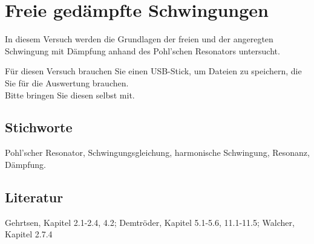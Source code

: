 \chapter{Freie gedämpfte Schwingungen}
\label{vn:1}

In diesem Versuch werden die Grundlagen der freien und der angeregten Schwingung mit Dämpfung anhand des Pohl'schen Resonators untersucht.
\begin{hint}
	Für diesen Versuch brauchen Sie einen USB-Stick, um Dateien zu speichern, die Sie für die Auswertung brauchen.\\
	Bitte bringen Sie diesen selbst mit.
\end{hint}


\section{Stichworte}
Pohl'scher Resonator, Schwingungsgleichung, harmonische Schwingung, Resonanz, Dämpfung.
%
\section{Literatur}
Gehrtsen, Kapitel 2.1-2.4, 4.2; Demtröder, Kapitel 5.1-5.6, 11.1-11.5; Walcher, Kapitel 2.7.4
%
